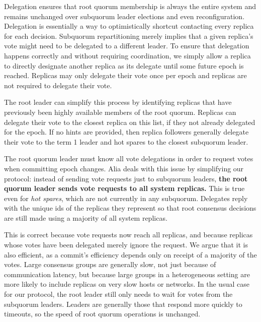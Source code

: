 \documentclass[11pt,conference]{IEEEtran}
\newcommand{\sys}{Alia\xspace}
\begin{document}
Delegation ensures that root quorum membership is always the entire
system and remains unchanged over subquorum leader elections and even
reconfiguration.
Delegation is essentially a way to optimistically shortcut contacting
every replica for each decision.
Subquorum repartitioning merely implies that a given replica's vote
might need to be delegated to a different leader.
To ensure that delegation happens correctly and without requiring
coordination, we simply allow a replica to directly designate another
replica as its delegate until some future epoch is reached.
Replicas may only delegate their vote once per epoch and replicas are
not required to delegate their vote.

The root leader can simplify this process by 
 identifying
replicas that have previously been highly available members of the root quorum.
Replicas can delegate their vote to the closest replica on this list,
if they not already
delegated for the epoch.
If no hints are provided, then replica followers generally delegate
their vote to the term 1 leader and hot spares to the closest subquorum
leader.

The root quorum leader must
know all vote delegations in order to request votes when committing epoch
changes.
\sys deals with this issue by simplifying our protocol:
instead of sending vote requests just to subquorum leaders,
\textbf{the root quorum leader sends vote requests to all system
replicas.}
This is true even for \emph{hot spares}, which are not currently
in any subquorum.
Delegates reply with the
unique ids of the replicas they represent 
so that root consensus decisions are still made using a majority of
all system replicas.

This is correct because vote requests now reach all replicas, and
because replicas whose votes have been delegated merely ignore the
request.
We argue that it is also efficient, as a commit's efficiency depends
only on receipt of a majority of the votes.
Large consensus groups are generally slow, not just because of
communication latency, but because large groups in a heterogeneous
setting are more likely to include replicas on very slow hosts or
networks.
In the usual case for our protocol, the root leader still only needs
to wait for votes from the subquorum leaders.
Leaders are generally those that respond more quickly to timeouts, so
the speed of root quorum operations is unchanged.

\end{document}
